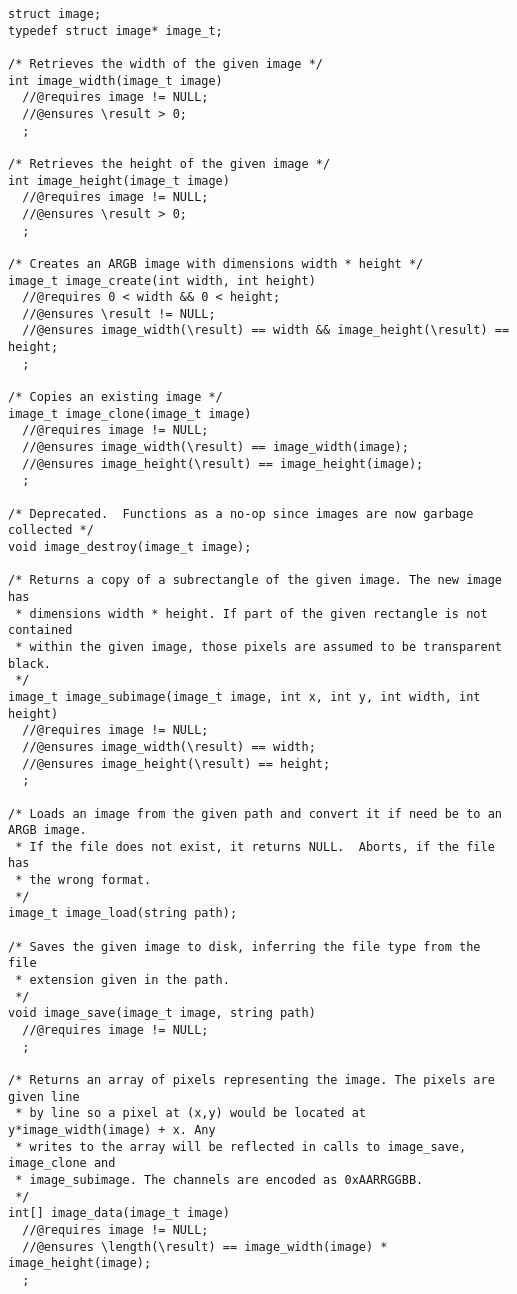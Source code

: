 \documentclass[11pt]{article}
\begin{document}
\begin{small}
\begin{verbatim}
struct image;
typedef struct image* image_t;

/* Retrieves the width of the given image */
int image_width(image_t image)
  //@requires image != NULL;
  //@ensures \result > 0;
  ;

/* Retrieves the height of the given image */
int image_height(image_t image)
  //@requires image != NULL;
  //@ensures \result > 0;
  ;

/* Creates an ARGB image with dimensions width * height */
image_t image_create(int width, int height)
  //@requires 0 < width && 0 < height;
  //@ensures \result != NULL;
  //@ensures image_width(\result) == width && image_height(\result) == height;
  ;

/* Copies an existing image */
image_t image_clone(image_t image)
  //@requires image != NULL;
  //@ensures image_width(\result) == image_width(image);
  //@ensures image_height(\result) == image_height(image);
  ;

/* Deprecated.  Functions as a no-op since images are now garbage collected */
void image_destroy(image_t image);

/* Returns a copy of a subrectangle of the given image. The new image has
 * dimensions width * height. If part of the given rectangle is not contained
 * within the given image, those pixels are assumed to be transparent black.
 */
image_t image_subimage(image_t image, int x, int y, int width, int height)
  //@requires image != NULL;
  //@ensures image_width(\result) == width;
  //@ensures image_height(\result) == height;
  ;

/* Loads an image from the given path and convert it if need be to an ARGB image.
 * If the file does not exist, it returns NULL.  Aborts, if the file has
 * the wrong format.
 */
image_t image_load(string path);

/* Saves the given image to disk, inferring the file type from the file
 * extension given in the path.
 */
void image_save(image_t image, string path)
  //@requires image != NULL;
  ;

/* Returns an array of pixels representing the image. The pixels are given line
 * by line so a pixel at (x,y) would be located at y*image_width(image) + x. Any
 * writes to the array will be reflected in calls to image_save, image_clone and
 * image_subimage. The channels are encoded as 0xAARRGGBB.
 */
int[] image_data(image_t image)
  //@requires image != NULL;
  //@ensures \length(\result) == image_width(image) * image_height(image);
  ;
\end{verbatim}
\end{small}
\end{document}
